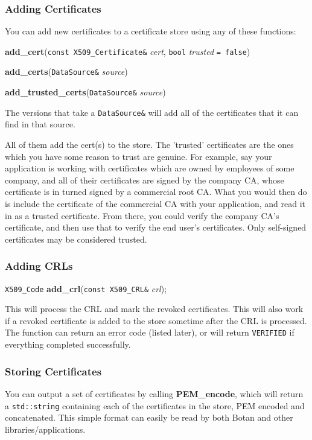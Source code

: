\documentclass{article}
\newcommand{\function}[1]{\textbf{#1}}
\newcommand{\type}[1]{\texttt{#1}}
\renewcommand{\arg}[1]{\textsl{#1}}
\begin{document}
\subsubsection{Adding Certificates}

You can add new certificates to a certificate store using any of these
functions:

\function{add\_cert}(\type{const X509\_Certificate\&} \arg{cert},
                     \type{bool} \arg{trusted} \type{= false})

\function{add\_certs}(\type{DataSource\&} \arg{source})

\function{add\_trusted\_certs}(\type{DataSource\&} \arg{source})

The versions that take a \type{DataSource\&} will add all of the certificates
that it can find in that source.

All of them add the cert(s) to the store. The 'trusted' certificates are the
ones which you have some reason to trust are genuine. For example, say your
application is working with certificates which are owned by employees of some
company, and all of their certificates are signed by the company CA, whose
certificate is in turned signed by a commercial root CA. What you would then do
is include the certificate of the commercial CA with your application, and read
it in as a trusted certificate. From there, you could verify the company CA's
certificate, and then use that to verify the end user's certificates. Only
self-signed certificates may be considered trusted.

\subsubsection{Adding CRLs}

\type{X509\_Code} \function{add\_crl}(\type{const X509\_CRL\&} \arg{crl});

This will process the CRL and mark the revoked certificates. This will also
work if a revoked certificate is added to the store sometime after the CRL is
processed. The function can return an error code (listed later), or will return
\type{VERIFIED} if everything completed successfully.

\subsubsection{Storing Certificates}

You can output a set of certificates by calling \function{PEM\_encode}, which
will return a \type{std::string} containing each of the certificates in the
store, PEM encoded and concatenated. This simple format can easily be read by
both Botan and other libraries/applications.
\end{document}
